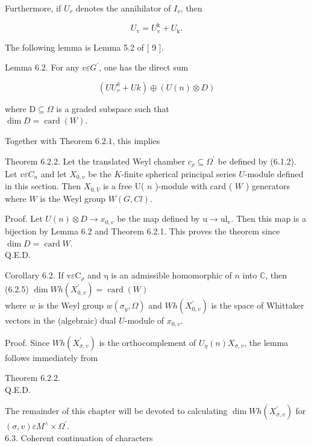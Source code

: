 \documentclass[10pt]{article}
\begin{document}
Furthermore, if $U_{v}$ denotes the annihilator of $I_{v}$, then


\begin{equation*}
U_{\mathrm{v}}=U_{\mathrm{v}}^{\mathrm{k}}+U_{\mathrm{k}} . \tag{6.2.4}
\end{equation*}


The following lemma is Lemma 5.2 of [ 9 ].

Lemma 6.2. For any $v \varepsilon G^{\prime}$, one has the direct sum

$$
\left(U U_{v}^{k}+U k\right) \oplus(U(n) \otimes D)
$$

where $\mathrm{D} \subseteq \Omega$ is a graded subspace such that\\
$\operatorname{dim} D=\operatorname{card}(W)$.

Together with Theorem 6.2.1, this implies

Theorem 6.2.2. Let the translated Weyl chamber $c_{\rho} \subseteq \Omega^{\prime}$ be defined by (6.1.2). Let $v \varepsilon C_{n}$ and let $X_{0, v}$ be the $K$-finite spherical principal series $U$-module defined in this section. Then $X_{0, V}$ is a free U( $n$ )-module with card ( $W$ ) generators where $W$ is the Weyl group $W(G, C l)$.

Proof. Let $U(n) \otimes D \rightarrow x_{0, v}$ be the map defined by $\mathrm{u} \rightarrow \mathrm{ul}_{\mathrm{v}}$. Then this map is a bijection by Lemma 6.2 and Theorem 6.2.1. This proves the theorem since $\operatorname{dim} D=\operatorname{card} W$.\\
Q.E.D.

Corollary 6.2. If $\mathrm{v} \varepsilon \mathrm{C}_{\rho}$ and $\mathrm{\eta}$ is an admissible homomorphic of $n$ into $\mathbb{C}$, then\\
(6.2.5) $\operatorname{dim} W h\left(X_{0, v}^{\prime}\right)=\operatorname{card}(W)$\\
where $w$ is the Weyl group $w\left(\sigma_{y}, \Omega\right)$ and $W h\left(X_{0, v}^{\prime}\right)$ is the space of Whittaker vectors in the (algebraic) dual $U$-module of $x_{0, v}$.

Proof. Since $W h\left(X_{\sigma, v}^{\prime}\right)$ is the orthocomplement of $U_{\eta}(n) X_{\sigma, v}$, the lemma follows immediately from

Theorem 6.2.2.\\
Q.E.D.

The remainder of this chapter will be devoted to calculating $\operatorname{dim} W h\left(X_{\sigma, v}^{\prime}\right)$ for $(\sigma, v) \varepsilon M^{\wedge} \times \Omega^{\prime}$.\\
6.3. Coherent continuation of characters
\end{document}
